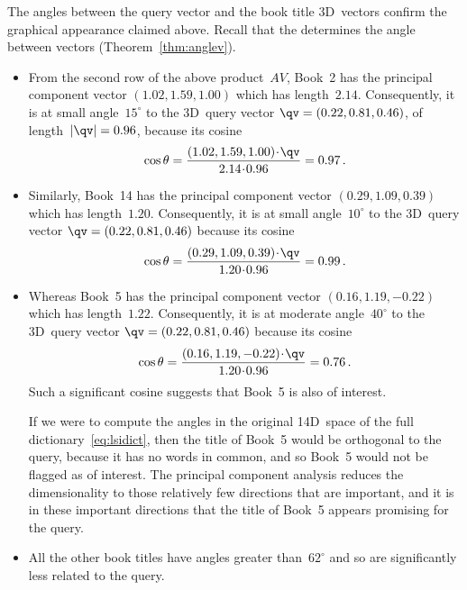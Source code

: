 The angles between the query vector and the book title 3D~vectors confirm the graphical appearance claimed above.
Recall that the  determines the angle between vectors (Theorem~\ref{thm:anglev}).
\begin{itemize}
\item From the second row of the above product~\(AV\), Book~2 has the principal component vector \((1.02,1.59,1.00)\) which has length~\(2.14\).
Consequently, it is at small angle~\(15^\circ\) to the 3D~query vector \(\qv=(0.22,0.81,0.46)\), of length~\(|\qv|=0.96\), because its cosine
\begin{equation*}
\cos\theta=\frac{(1.02,1.59,1.00)\cdot\qv}{2.14\cdot0.96}
=0.97\,.
\end{equation*}

\item Similarly, Book~14 has the principal component vector \((0.29,1.09,0.39)\) which has length~\(1.20\).
Consequently, it is at small angle~\(10^\circ\) to the 3D~query vector \(\qv=(0.22,0.81,0.46)\) because its cosine
\begin{equation*}
\cos\theta=\frac{(0.29,1.09,0.39)\cdot\qv}{1.20\cdot0.96}
=0.99\,.
\end{equation*}

\item Whereas Book~5 has the principal component vector \((0.16,1.19,-0.22)\) which has length~\(1.22\).
Consequently, it is at moderate angle~\(40^\circ\) to the 3D~query vector \(\qv=(0.22,0.81,0.46)\) because its cosine
\begin{equation*}
\cos\theta=\frac{(0.16,1.19,-0.22)\cdot\qv}{1.20\cdot0.96}
=0.76\,.
\end{equation*}
Such a significant cosine suggests that Book~5 is also of interest.

If we were to compute the angles in the original 14D~space of the full dictionary~\eqref{eq:lsidict}, then the title of Book~5 would be orthogonal to the query, because it has no words in common, and so Book~5 would not be flagged as of interest.
The principal component analysis reduces the dimensionality to those relatively few directions that are important, and it is in these important directions that the title of Book~5 appears promising for the query.

\item All the other book titles have angles greater than~\(62^\circ\) and so are significantly less related to the query.
\end{itemize}




